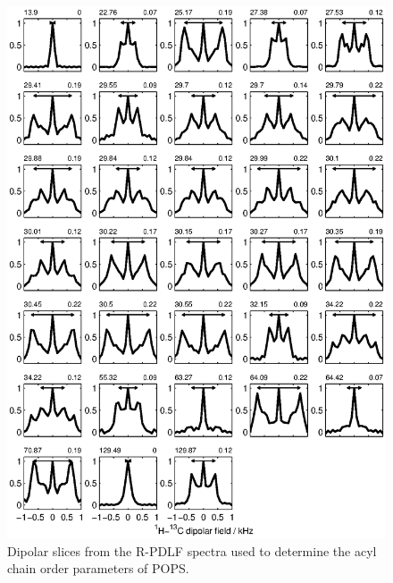 \documentclass[journal=jpcbfk,manuscript=article]{achemso}
\begin{document}
\begin{figure}[hbp!] 
  \centering 
  \includegraphics[width=\textwidth]{../Fig/slices_used.eps}
  \caption{\label{R-PDLFslices}
    Dipolar slices from the R-PDLF spectra used to determine the acyl chain order parameters of POPS.
  }
\end{figure} 



\pagebreak
\end{document}
